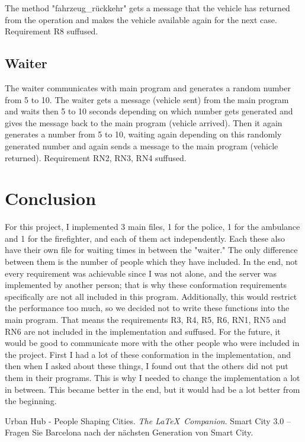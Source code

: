 \documentclass{article}
\begin{document}
The method "fahrzeug\_rückkehr" gets a message that the vehicle has returned from the operation and makes the vehicle available again for the next case.  Requirement R8 suffused.

\subsection{Waiter}
The waiter communicates with main program and generates a random number from 5 to 10. The waiter gets a message (vehicle sent) from the main program and waits then 5 to 10 seconds depending on which number gets generated and gives the message back to the main program (vehicle arrived). Then it again generates a number from 5 to 10, waiting again depending on this  randomly generated number and again sends a message to the main program (vehicle returned).  Requirement RN2, RN3, RN4  suffused.

\section{Conclusion}
For this project, I implemented 3 main files, 1 for the police, 1 for the ambulance and 1 for the firefighter, and each of them act independently.
\newline
Each these also have their own file for waiting times in between the "waiter."  The only difference between them is the number of people which they have included. 
\newline
In the end, not every requirement was achievable since I was not alone, and the server was implemented by another person; that is why these conformation requirements specifically are not all included in this program.
Additionally, this would restrict the performance too much, so we decided not to write these functions into the main program. That means the requirements R3, R4, R5, R6, RN1, RN5 and RN6 are not included in the implementation and suffused.
\newline
For the future, it would be good to communicate more with the other people who were included in the project. First I had a lot of these conformation in the implementation, and then when I asked about these things, I found out that the others did not put them in their programs. This is why I needed to change the implementation a lot in between. This became better in the end, but it would had be a lot better from the beginning.

\begin{thebibliography}{9}
\bibitem{}
Urban Hub - People Shaping Cities. 
\textit{The \LaTeX\ Companion}. 
Smart City 3.0 – Fragen Sie Barcelona nach der nächsten Generation von Smart City.



\end{thebibliography}
\end{document}
